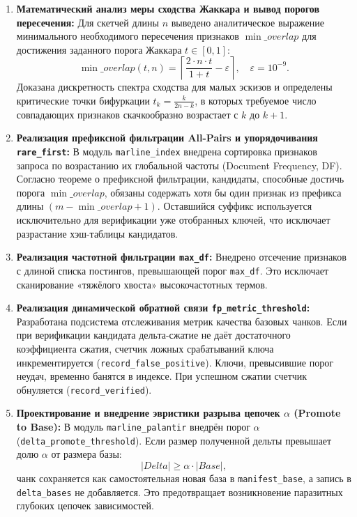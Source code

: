 \documentclass[a4paper,14pt]{extarticle}
\begin{document}
\begin{enumerate}
    \item \textbf{Математический анализ меры сходства Жаккара и вывод порогов пересечения:}
    Для скетчей длины $n$ выведено аналитическое выражение минимального необходимого пересечения признаков $\min\_overlap$ для достижения заданного порога Жаккара $t \in [0, 1]$:
    \begin{equation}
        \min\_overlap(t, n) = \left\lceil \frac{2 \cdot n \cdot t}{1 + t} - \varepsilon \right\rceil, \quad \varepsilon = 10^{-9}.
    \end{equation}
    Доказана дискретность спектра сходства для малых эскизов и определены критические точки бифуркации $t_k = \frac{k}{2n - k}$, в которых требуемое число совпадающих признаков скачкообразно возрастает с $k$ до $k+1$.

    \item \textbf{Реализация префиксной фильтрации All-Pairs и упорядочивания \texttt{rare\_first}:}
    В модуль \texttt{marline\_index} внедрена сортировка признаков запроса по возрастанию их глобальной частоты (Document Frequency, DF). Согласно теореме о префиксной фильтрации, кандидаты, способные достичь порога $\min\_overlap$, обязаны содержать хотя бы один признак из префикса длины $(m - \min\_overlap + 1)$. Оставшийся суффикс используется исключительно для верификации уже отобранных ключей, что исключает разрастание хэш-таблицы кандидатов.

    \item \textbf{Реализация частотной фильтрации \texttt{max\_df}:}
    Внедрено отсечение признаков с длиной списка постингов, превышающей порог \texttt{max\_df}. Это исключает сканирование «тяжёлого хвоста» высокочастотных термов.

    \item \textbf{Реализация динамической обратной связи \texttt{fp\_metric\_threshold}:}
    Разработана подсистема отслеживания метрик качества базовых чанков. Если при верификации кандидата дельта-сжатие не даёт достаточного коэффициента сжатия, счетчик ложных срабатываний ключа инкрементируется (\texttt{record\_false\_positive}). Ключи, превысившие порог неудач, временно банятся в индексе. При успешном сжатии счетчик обнуляется (\texttt{record\_verified}).

    \item \textbf{Проектирование и внедрение эвристики разрыва цепочек $\alpha$ (Promote to Base):}
    В модуль \texttt{marline\_palantir} внедрён порог $\alpha$ (\texttt{delta\_promote\_threshold}). Если размер полученной дельты превышает долю $\alpha$ от размера базы:
    \begin{equation}
        |Delta| \ge \alpha \cdot |Base|,
    \end{equation}
    чанк сохраняется как самостоятельная новая база в \texttt{manifest\_base}, а запись в \texttt{delta\_bases} не добавляется. Это предотвращает возникновение паразитных глубоких цепочек зависимостей.


\end{enumerate}
\end{document}
